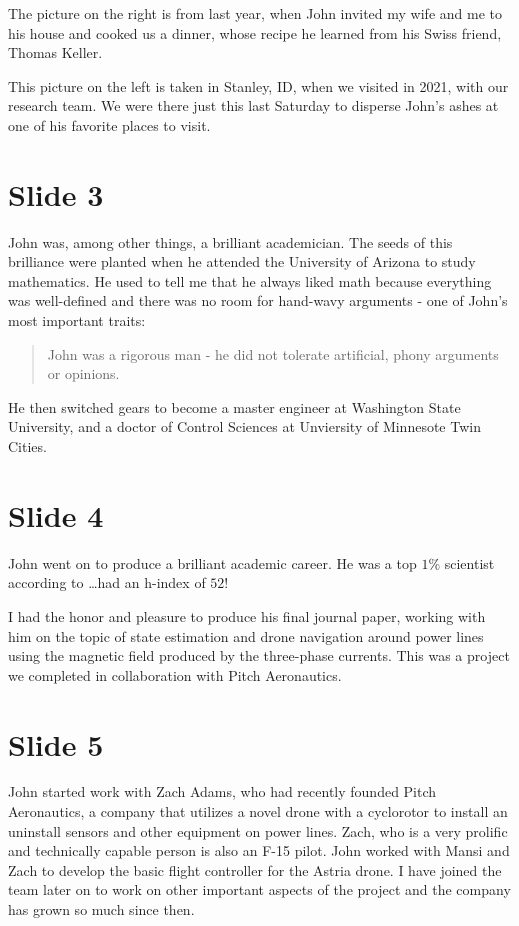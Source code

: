 \documentclass[journal,twoside,web]{ieeecolor}
\begin{document}
The picture on the right is from last year, when John invited my wife and me to 
his house and cooked us a dinner, whose recipe he learned from his Swiss friend,
Thomas Keller.

This picture on the left is taken in Stanley, ID, when we visited in 2021, with 
our research team. We were there just this last Saturday to disperse John's 
ashes at one of his favorite places to visit.

\section{Slide 3}

John was, among other things, a brilliant academician. The seeds of this brilliance were planted when he attended the University of Arizona to study 
mathematics. He used to tell me that he always liked math because everything was
well-defined and there was no room for hand-wavy arguments - one of John's most
important traits:

\begin{quote}
John was a rigorous man - he did not tolerate artificial, phony arguments or
opinions.
\end{quote}

He then switched gears to become a master engineer at Washington State
University, and a doctor of Control Sciences at Unviersity of Minnesote Twin
Cities.

\section{Slide 4}

John went on to produce a brilliant academic career. He was a top $1\%$ scientist according to \ldots had an h-index of $52$!

I had the honor and pleasure to produce his final journal paper, working with
him on the topic of state estimation and drone navigation around power lines
using the magnetic field produced by the three-phase currents. This was a
project we completed in collaboration with Pitch Aeronautics.


\section{Slide 5}

John started work with Zach Adams, who had recently founded Pitch Aeronautics, 
a company that utilizes a novel drone with a cyclorotor to install an uninstall 
sensors and other equipment on power lines. Zach, who is a very prolific and 
technically capable person is also an F-15 pilot. John worked with Mansi and
Zach to develop the basic flight controller for the Astria drone. I have joined
the team later on to work on other important aspects of the project and the 
company has grown so much since then.
\end{document}
